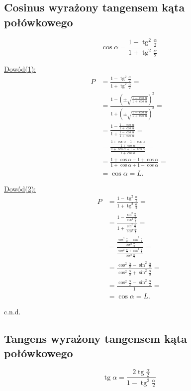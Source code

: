 \documentclass[12pt,a4paper,fleqn]{article}
\DeclareMathOperator{\tg}{tg}
\begin{document}
	\subsection{Cosinus wyrażony tangensem kąta połówkowego}
		\begin{equation*}
			\cos\alpha = \frac{1-\tg^2\frac{\alpha}{2}}{1+\tg^2\frac{\alpha}{2}}
		\end{equation*}
		
		\underline{Dowód(1):} \noindent
		\begin{align*}
			P &= \frac{1-\tg^2\frac{\alpha}{2}}{1+\tg^2\frac{\alpha}{2}} = \\
				&=\frac{1-(\pm\sqrt{\frac{1-\cos\alpha}{1+\cos\alpha}})^2}{1+(\pm\sqrt{\frac{1-\cos\alpha}{1+\cos\alpha}})^2} =\\
				&=\frac{1-\frac{1-\cos\alpha}{1+\cos\alpha}}{1+\frac{1-\cos\alpha}{1+\cos\alpha}} =\\
				&=\frac{\frac{1+\cos\alpha-1+\cos\alpha}{1+\cos\alpha}}{\frac{1+\cos\alpha+1-\cos\alpha}{1+\cos\alpha}} =\\
			&=\frac{1+\cos\alpha-1+\cos\alpha}{1+\cos\alpha+1-\cos\alpha} =\\
			&= \cos\alpha = L.
		\end{align*}
		
		\underline{Dowód(2):} \noindent
		\begin{align*}
			P &= \frac{1-\tg^2\frac{\alpha}{2}}{1+\tg^2\frac{\alpha}{2}} = \\
  			  &= \frac{1-\frac{\sin^2\frac{\alpha}{2}}{\cos^2\frac{\alpha}{2}}}{1+\frac{\sin^2\frac{\alpha}{2}}{\cos^2\frac{\alpha}{2}}}=\\
  			  &= \frac{\frac{\cos^2\frac{\alpha}{2}-\sin^2\frac{\alpha}{2}}{\cos^2\frac{\alpha}{2}}}{\frac{\cos^2\frac{\alpha}{2}+\sin^2\frac{\alpha}{2}}{\cos^2\frac{\alpha}{2}}}=\\
  			  &= \frac{\cos^2\frac{\alpha}{2}-\sin^2\frac{\alpha}{2}}{\cos^2\frac{\alpha}{2}+\sin^2\frac{\alpha}{2}}=\\
  			  &= \frac{\cos^2\frac{\alpha}{2}-\sin^2\frac{\alpha}{2}}{1}=\\
  			  &= \cos\alpha = L.
		\end{align*}
		
		c.n.d.
	\subsection{Tangens wyrażony tangensem kąta połówkowego}
		\begin{equation*}
			\tg\alpha = \frac{2\tg\frac{\alpha}{2}}{1-\tg^2\frac{\alpha}{2}}
		\end{equation*}
		
\end{document}
